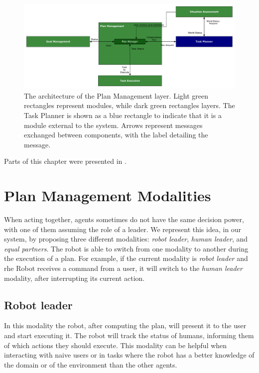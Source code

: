 \afterpage{\clearpage}
\begin{figure}
	\centering
	\includegraphics[scale=0.5]{img/coworker/plan_management/plan_management_architecture.pdf}
	\caption[The architecture of the Plan Management layer]{The architecture of the Plan Management layer. Light green rectangles represent modules, while dark green rectangles layers. The Task Planner is shown as a blue rectangle to indicate that it is a module external to the system. Arrows represent messages exchanged between components, with the label detailing the message.}
	\label{fig:plan_management-architecture}
\end{figure}


Parts of this chapter were presented in \cite{Lallement2014,fioreiser2014}.

\section{Plan Management Modalities}
\label{sec:plan_management-modalities}
When acting together, agents sometimes do not have the same decision power, with one of them assuming the role of a leader. We represent this idea, in our system, by proposing three different modalities: \textit{robot leader}, \textit{human leader}, and \textit{equal partners}. The robot is able to switch from one modality to another during the execution of a plan. For example, if the current modality is \textit{robot leader} and rhe Robot receives a command from a user, it will switch to the \textit{human leader} modality, after interrupting its current action.

\subsection{Robot leader}
\label{subsec:plan_management-robot_leader}
In this modality the robot, after computing the plan, will present it to the user and start executing it. The robot will track the status of humans, informing them of which actions they should execute. This modality can be helpful when interacting with  naive users or in tasks where the robot has a better knowledge of the  domain or of the environment than the other agents.

